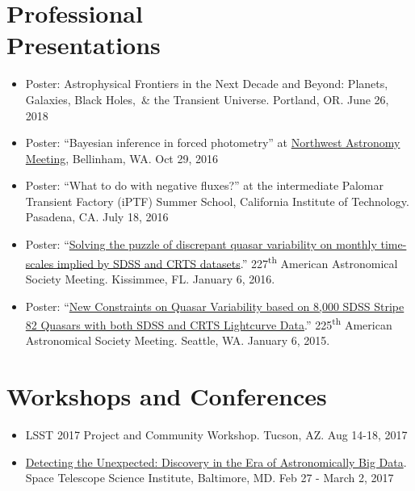 \documentclass[margin]{res}
\begin{document}
\begin{resume}
\section{Professional\\ Presentations} 
\begin{itemize}  %

\item Poster:    Astrophysical Frontiers in the Next Decade and Beyond: Planets, Galaxies, Black Holes,~\& the Transient Universe. Portland, OR. June 26, 2018 

\item Poster: ``Bayesian inference in forced photometry'' at \href{http://myweb.facstaff.wwu.edu/~davenpj3/nwam2016/}{Northwest Astronomy Meeting}, Bellinham, WA. Oct 29, 2016 

\item Poster: ``What to do with negative fluxes?'' at the intermediate Palomar Transient Factory (iPTF) Summer School, California Institute of Technology.  Pasadena, CA. July 18, 2016

\item Poster: ``\href{http://adsabs.harvard.edu/abs/2016AAS...22724335S}{Solving the puzzle of discrepant quasar variability on monthly time-scales implied by SDSS and CRTS datasets}.'' 227\textsuperscript{th} American Astronomical Society Meeting. Kissimmee, FL. January 6, 2016.

\item Poster: ``\href{http://adsabs.harvard.edu/abs/2015AAS...22514464S}{New Constraints on Quasar Variability based on 8,000 SDSS Stripe 82 Quasars with both SDSS and CRTS Lightcurve Data}.'' 225\textsuperscript{th} American Astronomical Society Meeting. Seattle, WA. January 6, 2015.

\end{itemize}


\section{Workshops and Conferences}
\begin{itemize}

    \item LSST 2017 Project and Community Workshop. Tucson, AZ. Aug 14-18, 2017

	\item \href{http://www.cvent.com/events/detecting-the-unexpected-discovery-in-the-era-of-astronomically-big-data/event-summary-0db6808d548b4a9ea6466b43046a1ff5.aspx}{Detecting the Unexpected: Discovery in the Era of Astronomically Big Data}. Space Telescope Science Institute, Baltimore, MD. Feb 27 - March 2, 2017 


\end{itemize}
\end{resume}
\end{document}
